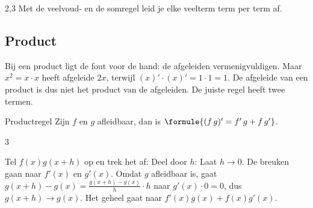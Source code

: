 \begin{alleenvoor}{2,3}
Met de veelvoud- en de somregel leid je elke veelterm term per term af.


\begin{oefeningen}
\end{oefeningen}

\subsection{Product}

Bij een product ligt de fout voor de hand: de afgeleiden vermenigvuldigen. Maar $x^2 = x \cdot x$ heeft afgeleide $2x$, terwijl $(x)' \cdot (x)' = 1 \cdot 1 = 1$. De afgeleide van een product is dus niet het product van de afgeleiden. De juiste regel heeft twee termen.

\begin{theorie}
\begin{stelling}{Productregel}
Zijn $f$ en $g$ afleidbaar, dan is \quad $\formule{(f\,g)' = f'\,g + f\,g'}$.
\end{stelling}
\begin{alleenvoor}{3}
\begin{bewijs}
Tel $f(x)g(x + h)$ op en trek het af:
Deel door $h$:
Laat $h \to 0$. De breuken gaan naar $f'(x)$ en $g'(x)$. Omdat $g$ afleidbaar is, gaat $g(x + h) - g(x) = \frac{g(x + h) - g(x)}{h} \cdot h$ naar $g'(x) \cdot 0 = 0$, dus $g(x + h) \to g(x)$. Het geheel gaat naar $f'(x)g(x) + f(x)g'(x)$.
\end{bewijs}
\end{alleenvoor}
\end{theorie}


\end{alleenvoor}
